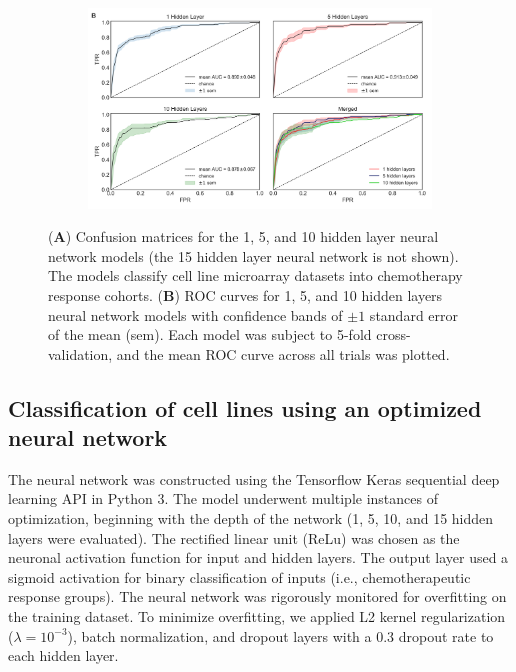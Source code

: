 \documentclass[10pt, letterpaper]{article}
\begin{document}
\begin{multicols*}{2}
\begin{figure}[!ht]
    \begin{subfigure}[t]{\textwidth}
        \centering
        \includegraphics[width=\textwidth]{Figures/roc/roc_combined.png}
    \end{subfigure}

    \caption{(\textbf{A}) Confusion matrices for the 1, 5, and 10 hidden layer neural network models (the 15 hidden layer neural network is not shown). The models classify cell line microarray datasets into chemotherapy response cohorts. (\textbf{B}) ROC curves for 1, 5, and 10 hidden layers neural network models with confidence bands of $\pm 1$ standard error of the mean (sem). Each model was subject to 5-fold cross-validation, and the mean ROC curve across all trials was plotted.}
    \label{fig:nnet}
\end{figure}


\subsection{Classification of cell lines using an optimized neural network}
The neural network was constructed using the Tensorflow Keras sequential deep learning API \cite{keras} in Python 3. The model underwent multiple instances of optimization, beginning with the depth of the network (1, 5, 10, and 15 hidden layers were evaluated). The rectified linear unit (ReLu) was chosen as the neuronal activation function for input and hidden layers. The output layer used a sigmoid activation for binary classification of inputs (i.e., chemotherapeutic response groups). The neural network was rigorously monitored for overfitting on the training dataset. To minimize overfitting, we applied L2 kernel regularization ($\lambda=10^{-3}$), batch normalization, and dropout layers with a 0.3 dropout rate to each hidden layer.


\end{multicols*}
\end{document}
